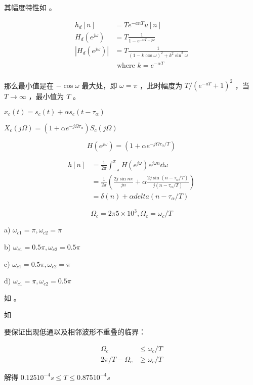 \documentclass[lang=cn,11pt,a4paper,cite=authoryear,twocolumn]{elegantpaper}
\begin{document}
其幅度特性如  。




\[\begin{aligned}
    h_d[n] &= T e^{-a n T} u[n] \\ 
    H_d(e^{j\omega}) &= T \frac{1}{1 - e^{-\alpha T - j \omega}} \\
    |H_d(e^{j\omega})| &= T \frac{1}{(1-k\cos \omega)^2 + k^2 \sin^2 \omega}\\
    & \text{ where } k = e^{-\alpha T} \\ 
\end{aligned}\]

那么最小值是在 \( -\cos \omega \) 最大处，即 \(\omega = \pi \) ，此时幅度为 \(T/(e^{-a T} + 1)^2\) ，当 \(T \rightarrow \infty\) ，最小值为 \(T\) 。



\(x_c(t) = s_c(t) + \alpha s_c(t-\tau_\alpha)\) 

\(X_c(j\Omega) =(1 + \alpha e^{-j\Omega \tau_\alpha}) S_c(j\Omega) \)


\[H(e^{j\omega}) = (1 + \alpha e^{-j\Omega \tau_\alpha / T}) \]


\[\begin{aligned}
    h[n] &= \frac{1}{2\pi} \int_{-\pi}^\pi H(e^{j\omega}) e^{j\omega n} \dd{\omega} \\
    &= \frac{1}{2\pi} (\frac{2 j \sin n \pi}{j n} + \alpha\frac{2 j \sin (n - \tau_\alpha/T)}{j (n -\tau_\alpha/T)}) \\ 
    &= \delta(n) + \alpha delta(n - \tau_\alpha/T)
\end{aligned}\]


\[\Omega_c = 2\pi 5 \times 10^3, \Omega_c = \omega_c/T\] 

a) \(\omega_{c1} = \pi, \omega_{c2} = \pi\) 

b) \(\omega_{c1} = 0.5\pi, \omega_{c2} = 0.5\pi\) 

c) \(\omega_{c1} = 0.5\pi, \omega_{c2} = \pi\) 

d) \(\omega_{c1} = \pi, \omega_{c2} = 0.5\pi\) 

如  。





如  




要保证出现低通以及相邻波形不重叠的临界：

\[\begin{aligned}
    \Omega_c &\leq \omega_c / T         \\
    2 \pi / T - \Omega_c &\ge \omega_c / T
\end{aligned}\]

解得 \(0.125 10^{-4} s \leq T \leq 0.875 10^{-4} s\)

\end{document}
